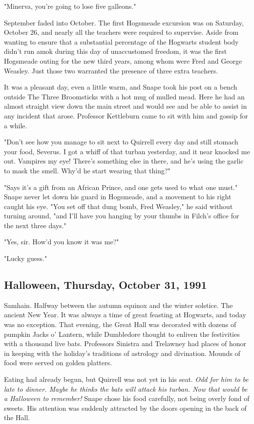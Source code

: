 \documentclass[a4paper,11pt]{article}
\begin{document}
"Minerva, you're going to lose five galleons."

September faded into October. The first Hogsmeade excursion was on Saturday, October 26, and nearly all the teachers were required to supervise. Aside from wanting to ensure that a substantial percentage of the Hogwarts student body didn't run amok during this day of unaccustomed freedom, it was the first Hogsmeade outing for the new third years, among whom were Fred and George Weasley. Just those two warranted the presence of three extra teachers.

It was a pleasant day, even a little warm, and Snape took his post on a bench outside The Three Broomsticks with a hot mug of mulled mead. Here he had an almost straight view down the main street and would see and be able to assist in any incident that arose. Professor Kettleburn came to sit with him and gossip for a while.

"Don't see how you manage to sit next to Quirrell every day and still stomach your food, Severus. I got a whiff of that turban yesterday, and it near knocked me out. Vampires my eye! There's something else in there, and he's using the garlic to mask the smell. Why'd he start wearing that thing?"

"Says it's a gift from an African Prince, and one gets used to what one must." Snape never let down his guard in Hogsmeade, and a movement to his right caught his eye. "You set off that dung bomb, Fred Weasley," he said without turning around, "and I'll have you hanging by your thumbs in Filch's office for the next three days."

"Yes, sir. How'd you know it was me?"

"Lucky guess."

\subsection{Halloween, Thursday, October 31, 1991}

Samhain. Halfway between the autumn equinox and the winter solstice. The ancient New Year. It was always a time of great feasting at Hogwarts, and today was no exception. That evening, the Great Hall was decorated with dozens of pumpkin Jacks o' Lantern, while Dumbledore thought to enliven the festivities with a thousand live bats. Professors Sinistra and Trelawney had places of honor in keeping with the holiday's traditions of astrology and divination. Mounds of food were served on golden platters.

Eating had already begun, but Quirrell was not yet in his seat. \emph{Odd for him to be late to dinner. Maybe he thinks the bats will attack his turban. Now that would be a Halloween to remember!} Snape chose his food carefully, not being overly fond of sweets. His attention was suddenly attracted by the doors opening in the back of the Hall.
\end{document}
